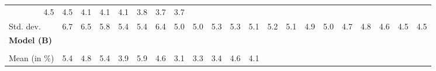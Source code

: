 \begin{tabular}{lllllllllllllllllllll}
  \multicolumn{1}{r}{4.5} &
  \multicolumn{1}{r}{4.5} &
  \multicolumn{1}{r}{4.1} &
  \multicolumn{1}{r}{4.1} &
  \multicolumn{1}{r}{4.1} &
  \multicolumn{1}{r}{3.8} &
  \multicolumn{1}{r}{3.7} &
  \multicolumn{1}{r}{3.7} \\
\multicolumn{1}{l}{\hspace{2em}Std. dev.} &
  \multicolumn{1}{|r}{6.7} &
  \multicolumn{1}{r}{6.5} &
  \multicolumn{1}{r}{5.8} &
  \multicolumn{1}{r}{5.4} &
  \multicolumn{1}{r}{5.4} &
  \multicolumn{1}{r}{6.4} &
  \multicolumn{1}{r}{5.0} &
  \multicolumn{1}{r}{5.0} &
  \multicolumn{1}{r}{5.3} &
  \multicolumn{1}{r}{5.3} &
  \multicolumn{1}{r}{5.1} &
  \multicolumn{1}{r}{5.2} &
  \multicolumn{1}{r}{5.1} &
  \multicolumn{1}{r}{4.9} &
  \multicolumn{1}{r}{5.0} &
  \multicolumn{1}{r}{4.7} &
  \multicolumn{1}{r}{4.8} &
  \multicolumn{1}{r}{4.6} &
  \multicolumn{1}{r}{4.5} &
  \multicolumn{1}{r}{4.5} \\
\multicolumn{1}{l}{{\textbf{Model (B)}}} &
  \multicolumn{1}{|r}{} &
  \multicolumn{1}{r}{} &
  \multicolumn{1}{r}{} &
  \multicolumn{1}{r}{} &
  \multicolumn{1}{r}{} &
  \multicolumn{1}{r}{} &
  \multicolumn{1}{r}{} &
  \multicolumn{1}{r}{} &
  \multicolumn{1}{r}{} &
  \multicolumn{1}{r}{} &
  \multicolumn{1}{r}{} &
  \multicolumn{1}{r}{} &
  \multicolumn{1}{r}{} &
  \multicolumn{1}{r}{} &
  \multicolumn{1}{r}{} &
  \multicolumn{1}{r}{} &
  \multicolumn{1}{r}{} &
  \multicolumn{1}{r}{} &
  \multicolumn{1}{r}{} &
  \multicolumn{1}{r}{} \\
\multicolumn{1}{l}{\hspace{1em}{\textit{Multiplicative term} ($\widehat{\tau}^{adv}$)}} &
  \multicolumn{1}{|r}{} &
  \multicolumn{1}{r}{} &
  \multicolumn{1}{r}{} &
  \multicolumn{1}{r}{} &
  \multicolumn{1}{r}{} &
  \multicolumn{1}{r}{} &
  \multicolumn{1}{r}{} &
  \multicolumn{1}{r}{} &
  \multicolumn{1}{r}{} &
  \multicolumn{1}{r}{} &
  \multicolumn{1}{r}{} &
  \multicolumn{1}{r}{} &
  \multicolumn{1}{r}{} &
  \multicolumn{1}{r}{} &
  \multicolumn{1}{r}{} &
  \multicolumn{1}{r}{} &
  \multicolumn{1}{r}{} &
  \multicolumn{1}{r}{} &
  \multicolumn{1}{r}{} &
  \multicolumn{1}{r}{} \\
\multicolumn{1}{l}{\hspace{2em}Mean (in $\%$)} &
  \multicolumn{1}{|r}{5.4} &
  \multicolumn{1}{r}{4.8} &
  \multicolumn{1}{r}{5.4} &
  \multicolumn{1}{r}{3.9} &
  \multicolumn{1}{r}{5.9} &
  \multicolumn{1}{r}{4.6} &
  \multicolumn{1}{r}{3.1} &
  \multicolumn{1}{r}{3.3} &
  \multicolumn{1}{r}{3.4} &
  \multicolumn{1}{r}{4.6} &
  \multicolumn{1}{r}{4.1} &

\end{tabular}
